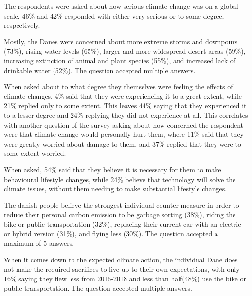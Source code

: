         The respondents were asked about how serious climate change was on a global scale. 46\% and 42\% responded with either very serious or to some degree, respectively. 
        
        Mostly, the Danes were concerned about more extreme storms and downpours (73\%), rising water levels (65\%), larger and more widespread desert areas (59\%), increasing extinction of animal and plant species (55\%), and increased lack of drinkable water (52\%). The question accepted multiple answers\cite{concito}.
        
        When asked about to what degree they themselves were feeling the effects of climate changes, 4\% said that they were experiencing it to a great extent, while 21\% replied only to some extent. This leaves 44\% saying that they experienced it to a lesser degree and 24\% replying they did not experience at all\cite{concito}. This correlates with another question of the survey asking about how concerned the respondent were that climate change would personally hurt them, where 11\% said that they were greatly worried about damage to them, and 37\% replied that they were to some extent worried\cite{concito}.
        
        When asked, 54\% said that they believe it is necessary for them to make behavioural lifestyle changes, while 24\% believe that technology will solve the climate issues, without them needing to make substantial lifestyle changes\cite{concito}.
        
        The danish people believe the strongest individual counter measure in order to reduce their personal carbon emission to be garbage sorting (38\%), riding the bike or public transportation (32\%), replacing their current car with an electric or hybrid version (31\%), and flying less (30\%). The question accepted a maximum of 5 answers\cite{concito}.

        When it comes down to the expected climate action, the individual Dane does not make the required sacrifices to live up to their own expectations, with only 16\% saying they flew less from 2016-2018 and less than half(48\%) use the bike or public transportation. The question accepted multiple answers\cite{concito}.
        
